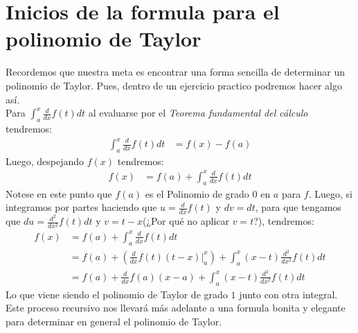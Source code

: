 \documentclass[12pt,a4paper,oneside]{memoir}
\begin{document}
\section*{Inicios de la formula para el polinomio de Taylor}
Recordemos que nuestra meta es encontrar una forma sencilla de determinar un polinomio de Taylor. Pues, dentro de un ejercicio practico podremos hacer algo así.\\

Para $\int_{a}^x \frac{d}{dx} f(t) dt$ al evaluarse por el \textit{Teorema fundamental del cálculo} tendremos:
\begin{align*}
    \int_{a}^x \frac{d}{dx} f(t) dt &= f(x) - f(a)
\end{align*}
Luego, despejando $f(x)$ tendremos:
\begin{align*}
    f(x) &= f(a) + \int_{a}^x \frac{d}{dx} f(t) dt
\end{align*}
Notese en este punto que $f(a)$ es el Polinomio de grado $0$ en $a$ para $f$. Luego, si integramos por partes haciendo que $u = \frac{d}{dx} f(t)$ y $dv = dt$, para que tengamos que $du = \frac{d^2}{dx^2} f(t) dt$ y $v = t-x$(¿Por qué no aplicar $v = t$?), tendremos:
\begin{align*}
    f(x) &= f(a) + \int_{a}^x \frac{d}{dx} f(t) dt\\
    &= f(a) + \left(\frac{d}{dx} f(t) (t -x)|_{a}^{x}\right) + \int_{a}^x (x-t) \frac{d^2}{dx^2}f(t) dt\\
    &= f(a) + \frac{d}{dx} f(a)(x-a) + \int_{a}^x (x-t) \frac{d^2}{dx^2} f(t)dt
\end{align*}
Lo que viene siendo el polinomio de Taylor de grado $1$ junto con otra integral. Este proceso recursivo nos llevará más adelante a una formula bonita y elegante para determinar en general el polinomio de Taylor.
\end{document}
